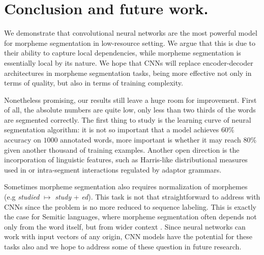 \documentclass[11pt,a4paper]{article}
\begin{document}
\section{Conclusion and future work.}

We demonstrate that convolutional neural networks are the most powerful model for morpheme segmentation in low-resource setting. We argue that this is due to their ability to capture local dependencies, while morpheme segmentation is essentially local by its nature. We hope that CNNs will replace encoder-decoder architectures in morpheme segmentation tasks, being more effective not only in terms of quality, but also in terms of training complexity.

Nonetheless promising, our results still leave a huge room for improvement. First of all, the absolute numbers are quite low, only less than two thirds of the words are segmented correctly. The first thing to study is the learning curve of neural segmentation algorithm: it is not so important that a model achieves $60\%$ accuracy on $1000$ annotated words, more important is whether it may reach $80\%$ given another thousand of training examples. Another open direction is the incorporation of linguistic features, such as Harris-like distributional measures used in  or intra-segment interactions regulated by adaptor grammars. 

Sometimes morpheme segmentation also requires normalization of morphemes (e.g \textit{studied} $\mapsto$ \textit{study} + \textit{ed}). This task is not that straightforward to address with CNNs since the problem is no more reduced to sequence labeling. This is exactly the case for Semitic languages, where morpheme segmentation often depends not only from the word itself, but from wider context . Since neural networks can work with input vectors of any origin, CNN models have the potential for these tasks also and we hope to address some of these question in future research.



\end{document}
